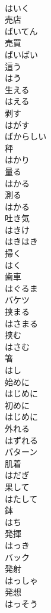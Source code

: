 \documentclass[8pt]{extreport}
\begin{document}
\begin{CJK}{UTF8}{min}
\\	はいく	
\\	売店 
\\	ばいてん	
\\	売買 
\\	ばいばい	
\\	這う 
\\	はう	
\\	生える 
\\	はえる	
\\	剥す 
\\	はがす	
\\	ばからしい	
\\	秤 
\\	はかり	
\\	量る 
\\	はかる	
\\	測る 
\\	はかる	
\\	吐き気 
\\	はきけ	
\\	はきはき	
\\	掃く 
\\	はく	
\\	歯車 
\\	はぐるま	
\\	バケツ	
\\	挟まる 
\\	はさまる	
\\	挟む 
\\	はさむ	
\\	箸 
\\	はし	
\\	始めに 
\\	はじめに	
\\	初めに 
\\	はじめに	
\\	外れる 
\\	はずれる	
\\	パターン	
\\	肌着 
\\	はだぎ	
\\	果して 
\\	はたして	
\\	鉢 
\\	はち	
\\	発揮 
\\	はっき	
\\	バック	
\\	発射 
\\	はっしゃ	
\\	発想 
\\	はっそう	

\end{CJK}
\end{document}
